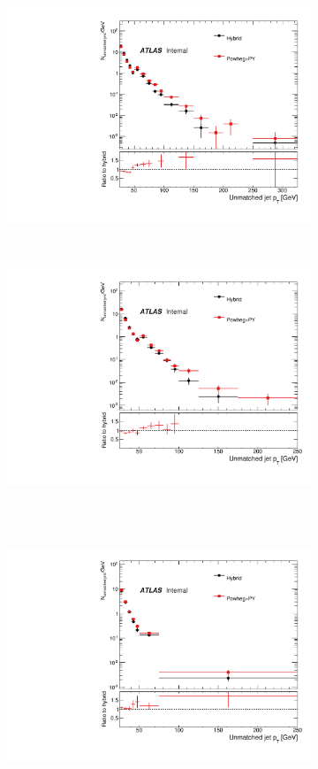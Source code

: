 \begin{figure}
~
\begin{subfigure}[]{0.45\textwidth}
\includegraphics[width=\textwidth]{fig/Pileup/RecoPtFalseJet0.pdf}
\end{subfigure}
~
\begin{subfigure}[]{0.45\textwidth}
\includegraphics[width=\textwidth]{fig/Pileup/RecoPtFalseJet1.pdf}
\end{subfigure}\\
~
\begin{subfigure}[]{0.45\textwidth}
\includegraphics[width=\textwidth]{fig/Pileup/RecoPtFalseJet2.pdf}

\end{subfigure}
\end{figure}
